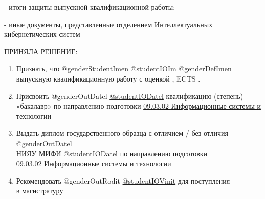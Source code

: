 \documentclass[a4paper,12pt]{article} %
\begin{document}
- итоги защиты выпускной квалификационной работы;

- иные документы, представленные отделением Интеллектуальных кибернетических систем

\par\smallskip

ПРИНЯЛА РЕШЕНИЕ:

\begin{enumerate}
	\item 	Признать, что @genderStudentImen \underline{@studentIOIm} @genderDefImen \\
	выпускную квалификационную работу с оценкой \makebox[10mm]{\hrulefill}\makebox[10mm]{\hrulefill}, ECTS \makebox[10mm]{\hrulefill}. 
	\vspace{-0.25cm}
	\item 	Присвоить @genderOutDatel \underline{@studentIODatel} квалификацию (степень)\\ «бакалавр» по направлению подготовки \underline{09.03.02 Информационные системы и технологии} 
	\vspace{-0.75cm}
	\item 	Выдать диплом государственного образца с отличием / без отличия @genderOutDatel \\
	НИЯУ МИФИ \underline{@studentIODatel} по направлению подготовки\\
	\underline{09.03.02 Информационные системы и технологии} 
	\vspace{-0.20cm}
	\item 	Рекомендовать @genderOutRodit \underline{@studentIOVinit}  для поступления\\
	 в магистратуру
	\vspace{-0.25cm}
\end{enumerate}
\par\bigskip
\end{document}
